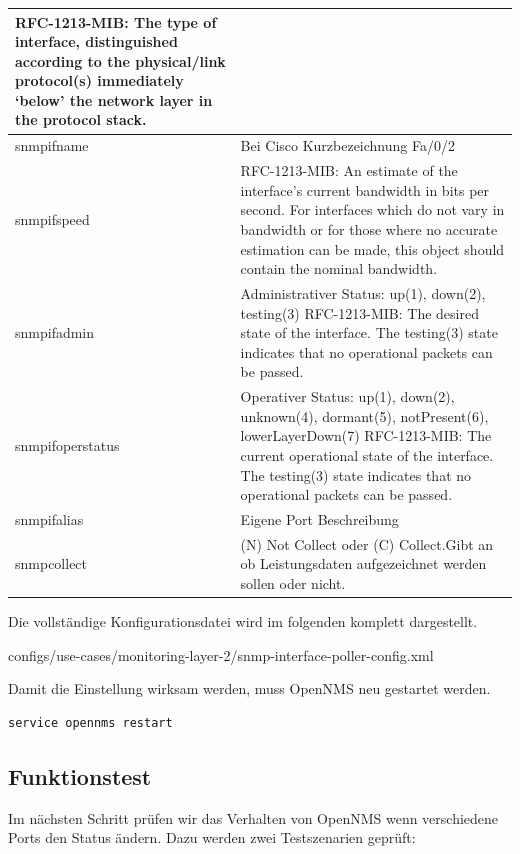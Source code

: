 \begin{longtable}{|p{3.5cm}|p{11cm}|}
RFC-1213-MIB: The type of interface, distinguished according to the physical/link protocol(s) immediately `below' the network layer in the protocol stack. \\
    \hline
    snmpifname    &    Bei Cisco Kurzbezeichnung Fa/0/2 \\
    \hline
    snmpifspeed    &    RFC-1213-MIB:  An estimate of the interface's current bandwidth in bits per second.  For interfaces which do not vary in bandwidth or for those where no accurate estimation can be made, this object should contain the nominal bandwidth. \\
    \hline
    snmpifadmin    &    Administrativer Status: up(1), down(2), testing(3)
RFC-1213-MIB: The desired state of the interface.  The testing(3) state indicates that no operational packets can be passed. \\
    \hline
    snmpifoperstatus    &    Operativer Status: up(1), down(2), unknown(4), dormant(5), notPresent(6), lowerLayerDown(7)
RFC-1213-MIB: The current operational state of the interface. The testing(3) state indicates that no operational packets can be passed. \\
    \hline
    snmpifalias    &    Eigene Port Beschreibung \\
    \hline
    snmpcollect    &    (N) Not Collect oder (C) Collect.Gibt an ob Leistungsdaten aufgezeichnet werden sollen oder nicht.
    \label{tbl:snmpifattrib}
\end{longtable}

Die vollständige Konfigurationsdatei wird im folgenden komplett dargestellt.


  {configs/use-cases/monitoring-layer-2/snmp-interface-poller-config.xml}

Damit die Einstellung wirksam werden, muss OpenNMS neu gestartet werden.

\begin{lstlisting}[numbers=none]
service opennms restart
\end{lstlisting}

\subsection{Funktionstest}
Im nächsten Schritt prüfen wir das Verhalten von OpenNMS wenn verschiedene Ports den Status ändern. Dazu werden zwei Testszenarien geprüft:

